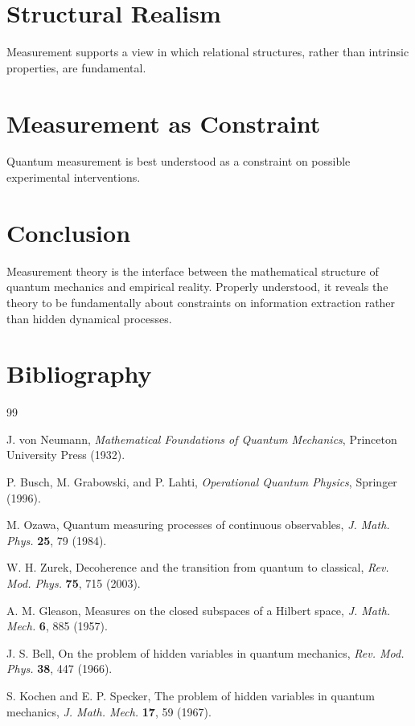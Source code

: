 \documentclass[12pt]{book}
\theoremstyle{plain}
\theoremstyle{definition}
\theoremstyle{remark}
\begin{document}
\chapter{Structural Realism}
Measurement supports a view in which relational structures, rather than intrinsic properties, are fundamental.

\chapter{Measurement as Constraint}
Quantum measurement is best understood as a constraint on possible experimental interventions.

\backmatter

\chapter*{Conclusion}
Measurement theory is the interface between the mathematical structure of quantum mechanics and empirical reality. Properly understood, it reveals the theory to be fundamentally about constraints on information extraction rather than hidden dynamical processes.

\chapter*{Bibliography}
\begin{thebibliography}{99}

J. von Neumann, \emph{Mathematical Foundations of Quantum Mechanics}, Princeton University Press (1932).

P. Busch, M. Grabowski, and P. Lahti, \emph{Operational Quantum Physics}, Springer (1996).

M. Ozawa, Quantum measuring processes of continuous observables, \emph{J. Math. Phys.} \textbf{25}, 79 (1984).

W. H. Zurek, Decoherence and the transition from quantum to classical, \emph{Rev. Mod. Phys.} \textbf{75}, 715 (2003).

A. M. Gleason, Measures on the closed subspaces of a Hilbert space, \emph{J. Math. Mech.} \textbf{6}, 885 (1957).

J. S. Bell, On the problem of hidden variables in quantum mechanics, \emph{Rev. Mod. Phys.} \textbf{38}, 447 (1966).

S. Kochen and E. P. Specker, The problem of hidden variables in quantum mechanics, \emph{J. Math. Mech.} \textbf{17}, 59 (1967).

\end{thebibliography}
\end{document}
